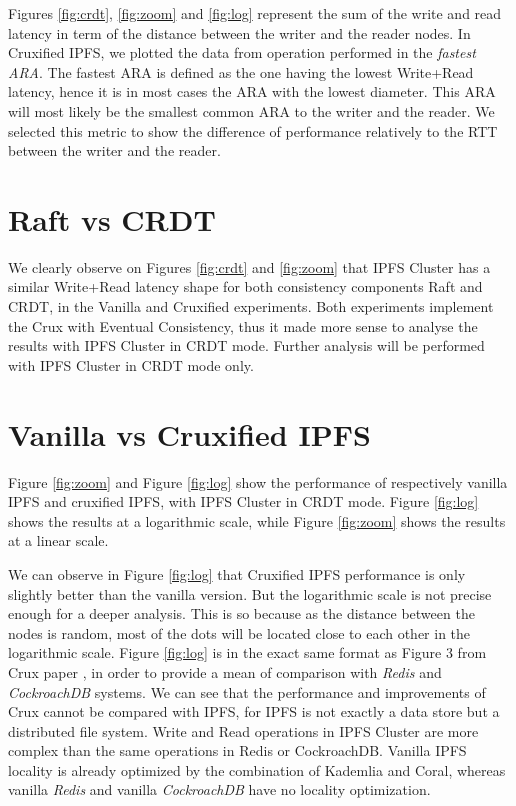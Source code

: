 \documentclass[a4paper,11pt,oneside]{report}
\begin{document}
Figures \ref{fig:crdt}, \ref{fig:zoom} and \ref{fig:log} represent the sum of the write and read latency in term of the distance between the writer and the reader nodes. In Cruxified IPFS, we plotted the data from operation performed in the \textit{fastest ARA}. The fastest ARA is defined as the one having the lowest Write+Read latency, hence it is in most cases the ARA with the lowest diameter. This ARA will most likely be the smallest common ARA to the writer and the reader. We selected this metric to show the difference of performance relatively to the RTT between the writer and the reader.

\section{Raft vs CRDT}

We clearly observe on Figures \ref{fig:crdt} and \ref{fig:zoom} that IPFS Cluster has a similar Write+Read latency shape for both consistency components Raft and CRDT, in the Vanilla and Cruxified experiments. Both experiments implement the Crux with Eventual Consistency, thus it made more sense to analyse the results with IPFS Cluster in CRDT mode. Further analysis will be performed with IPFS Cluster in CRDT mode only.

\section{Vanilla vs Cruxified IPFS}

Figure \ref{fig:zoom} and Figure \ref{fig:log} show the performance of respectively vanilla IPFS and cruxified IPFS, with IPFS Cluster in CRDT mode. Figure \ref{fig:log} shows the results at a logarithmic scale, while Figure \ref{fig:zoom} shows the results at a linear scale. 

We can observe in Figure \ref{fig:log} that Cruxified IPFS performance is only slightly better than the vanilla version. But the logarithmic scale is not precise enough for a deeper analysis. This is so because as the distance between the nodes is random, most of the dots will be located close to each other in the logarithmic scale.
Figure \ref{fig:log} is in the exact same format as Figure 3 from Crux paper \cite{crux}, in order to provide a mean of comparison with \textit{Redis} and \textit{CockroachDB} systems. We can see that the performance and improvements of Crux cannot be compared with IPFS, for IPFS is not exactly a data store but a distributed file system. Write and Read operations in IPFS Cluster are more complex than the same operations in Redis or CockroachDB. Vanilla IPFS locality is already optimized by the combination of Kademlia and Coral, whereas vanilla \textit{Redis} and vanilla \textit{CockroachDB} have no locality optimization.
\end{document}
